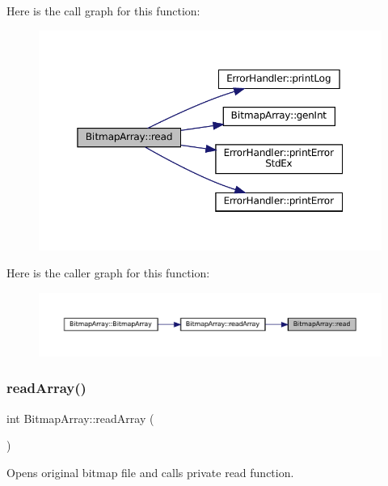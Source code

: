 Here is the call graph for this function\+:\nopagebreak
\begin{figure}[H]
\begin{center}
\leavevmode
\includegraphics[width=350pt]{classBitmapArray_a3a5834d03cd095769b422d4d66b9435f_cgraph}
\end{center}
\end{figure}
Here is the caller graph for this function\+:\nopagebreak
\begin{figure}[H]
\begin{center}
\leavevmode
\includegraphics[width=350pt]{classBitmapArray_a3a5834d03cd095769b422d4d66b9435f_icgraph}
\end{center}
\end{figure}
\mbox{\label{classBitmapArray_a4ce4b5acc896040075be63a559799e7e}} 
\subsubsection{\texorpdfstring{readArray()}{readArray()}}
{\footnotesize\ttfamily int Bitmap\+Array\+::read\+Array (\begin{DoxyParamCaption}{ }\end{DoxyParamCaption})}



Opens original bitmap file and calls private read function. 

